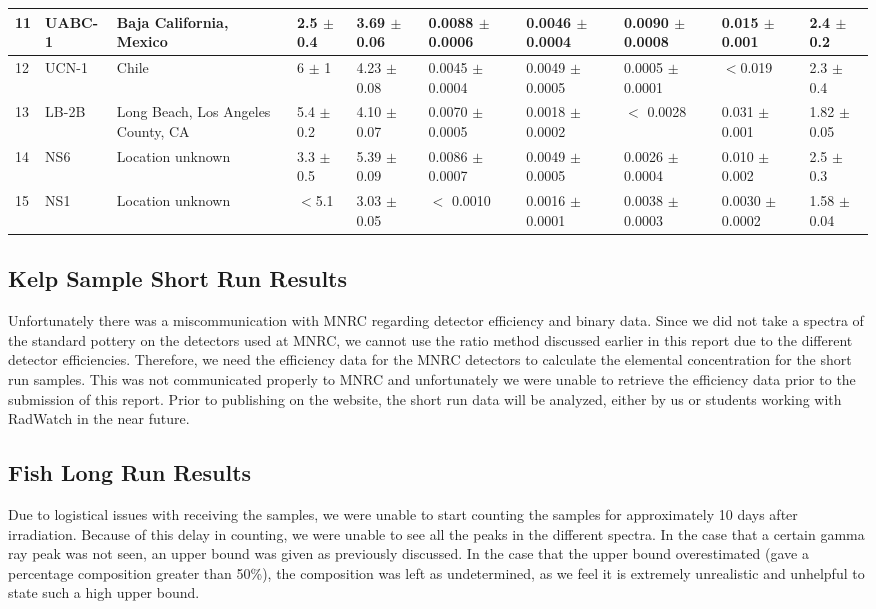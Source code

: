 \documentclass[]{article}
\begin{document}
\begin{table}[h]
{\begin{tabular}{ | l | l | l | l | l | l | l | l | l | l | }
	11 & UABC-1 & Baja California, Mexico & 2.5 $\pm$ 0.4 & 3.69 $\pm$ 0.06 & 0.0088 $\pm$ 0.0006 & 0.0046 $\pm$ 0.0004 & 0.0090 $\pm$ 0.0008 & 0.015 $\pm$ 0.001 & 2.4 $\pm$ 0.2 \\ \hline
	12 & UCN-1 & Chile & 6 $\pm$ 1 & 4.23 $\pm$ 0.08 & 0.0045 $\pm$ 0.0004 & 0.0049 $\pm$ 0.0005 & 0.0005 $\pm$ 0.0001 & $<$0.019 & 2.3 $\pm$ 0.4 \\ \hline
	13 & LB-2B & Long Beach, Los Angeles County, CA & 5.4 $\pm$ 0.2 & 4.10 $\pm$ 0.07 & 0.0070 $\pm$ 0.0005 & 0.0018 $\pm$ 0.0002 & $<$ 0.0028 & 0.031 $\pm$ 0.001 & 1.82 $\pm$ 0.05 \\ \hline
	14 & NS6 & Location unknown & 3.3 $\pm$ 0.5 & 5.39 $\pm$ 0.09 & 0.0086 $\pm$ 0.0007 & 0.0049 $\pm$ 0.0005 & 0.0026 $\pm$ 0.0004 & 0.010 $\pm$ 0.002 & 2.5 $\pm$ 0.3 \\ \hline
	15 & NS1 & Location unknown & $<$5.1 & 3.03 $\pm$ 0.05 & $<$ 0.0010 & 0.0016 $\pm$ 0.0001 & 0.0038 $\pm$ 0.0003 & 0.0030 $\pm$ 0.0002 & 1.58 $\pm$ 0.04 \\ \hline
\end{tabular}


}
\end{table}


\subsection{Kelp Sample Short Run Results}
Unfortunately there was a miscommunication with MNRC regarding detector efficiency and binary data. Since we did not take a spectra of the standard pottery on the detectors used at MNRC, we cannot use the ratio method discussed earlier in this report due to the different detector efficiencies. Therefore, we need the efficiency data for the MNRC detectors to calculate the elemental concentration for the short run samples. This was not communicated properly to MNRC and unfortunately we were unable to retrieve the efficiency data prior to the submission of this report. Prior to publishing on the website, the short run data will be analyzed, either by us or students working with RadWatch in the near future.

\subsection{Fish Long Run Results}

Due to logistical issues with receiving the samples, we were unable to start counting the samples for approximately 10 days after irradiation. Because of this delay in counting, we were unable to see all the peaks in the different spectra. In the case that a certain gamma ray peak was not seen, an upper bound was given as previously discussed. In the case that the upper bound overestimated (gave a percentage composition greater than 50\%), the composition was left as undetermined, as we feel it is extremely unrealistic and unhelpful to state such a high upper bound. 
\end{document}
